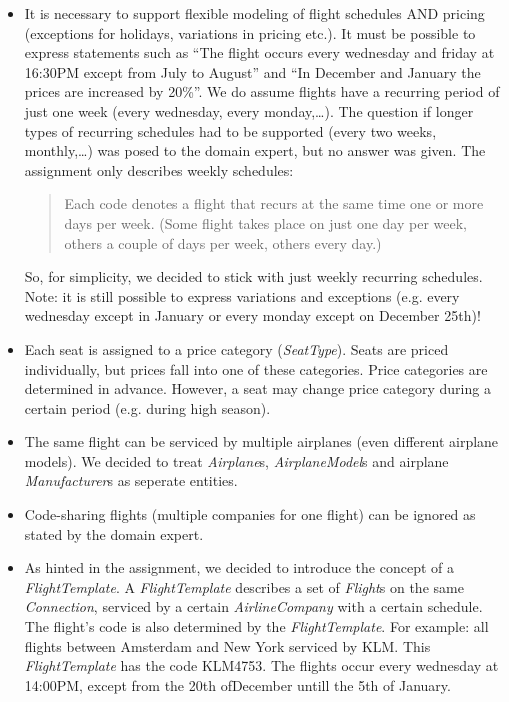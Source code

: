 \documentclass[a4paper]{article}
\newcommand{\field}[1]{\emph{#1}}
\begin{document}
\begin{itemize}

\item It is necessary to support flexible modeling of flight schedules AND pricing (exceptions for holidays, variations in pricing etc.).
It must be possible to express statements such as ``The flight occurs every wednesday and friday at 16:30PM except from July to August'' and ``In December and January the prices are increased by 20\%''.
We do assume flights have a recurring period of just one week (every wednesday, every monday,\dots).
The question if longer types of recurring schedules had to be supported (every two weeks, monthly,\dots) was posed to the domain expert, but no answer was given.
The assignment only describes weekly schedules:

\begin{quote}
Each code denotes a flight that recurs at the same time one or more days per week.
(Some flight takes place on just one day per week, others a couple of days per week, others every day.)
\end{quote}

So, for simplicity,  we decided to stick with just weekly recurring schedules.
Note: it is still possible to express variations and exceptions (e.g. every wednesday except in January or every monday except on December 25th)! \\

\item Each seat is assigned to a price category (\field{SeatType}).
Seats are priced individually, but prices fall into one of these categories.
Price categories are determined in advance.
However, a seat may change price category during a certain period (e.g. during high season).

\item The same flight can be serviced by multiple airplanes (even different airplane models).
We decided to treat \field{Airplane}s, \field{AirplaneModel}s and airplane \field{Manufacturer}s as seperate entities.\\

\item Code-sharing flights (multiple companies for one flight) can be ignored as stated by the domain expert.\\

\item As hinted in the assignment, we decided to introduce the concept of a \field{FlightTemplate}.
A \field{FlightTemplate} describes a set of \field{Flight}s on the same \field{Connection}, serviced by a certain \field{AirlineCompany} with a certain schedule.
The flight's code is also determined by the \field{FlightTemplate}.
For example: all flights between Amsterdam and New York serviced by KLM. This \field{FlightTemplate} has the code KLM4753.
The flights occur every wednesday at 14:00PM, except from the 20th ofDecember untill the 5th of January.


\end{itemize}
\end{document}
